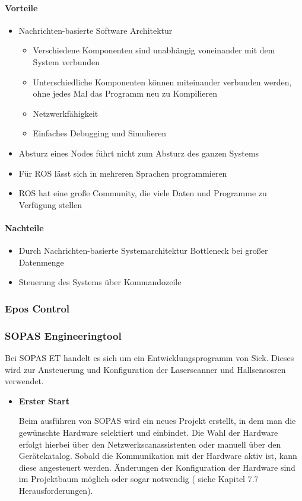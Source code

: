 \paragraph*{Vorteile}
\begin{itemize}
 \item Nachrichten-basierte Software Architektur
\begin{itemize}
\item Verschiedene Komponenten sind unabhängig voneinander mit dem System verbunden
\item Unterschiedliche Komponenten können miteinander verbunden werden, ohne jedes Mal das Programm neu zu Kompilieren
\item Netzwerkfähigkeit
\item Einfaches Debugging und Simulieren
\end{itemize}
\item Absturz eines Nodes führt nicht zum Absturz des ganzen
Systems
\item Für ROS lässt sich in mehreren Sprachen programmieren
\item ROS hat eine große Community, die viele Daten und Programme zu Verfügung
stellen
\end{itemize}
\paragraph*{Nachteile}
\begin{itemize}
 \item Durch Nachrichten-basierte Systemarchitektur Bottleneck bei großer Datenmenge
\item Steuerung des Systems über Kommandozeile
\end{itemize}

\subsubsection{Epos Control}

\subsubsection{SOPAS Engineeringtool}

Bei SOPAS ET handelt es sich um ein Entwicklungsprogramm von Sick. Dieses wird zur Ansteuerung und Konfiguration der Laserscanner und Hallsensosren verwendet.

\begin{itemize}
\item \textbf{ Erster Start }

Beim ausführen von SOPAS wird ein neues Projekt erstellt, in dem man die gewünschte Hardware selektiert und einbindet. Die Wahl der Hardware erfolgt hierbei über den Netzwerkscanassistenten oder manuell über den Gerätekatalog. Sobald die Kommunikation mit der Hardware aktiv ist, kann diese angesteuert werden. Änderungen der Konfiguration der Hardware sind im Projektbaum möglich oder sogar notwendig ( siehe Kapitel 7.7 Herausforderungen).
\end{itemize}
